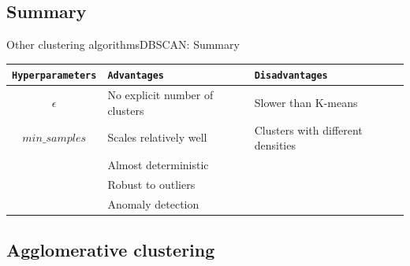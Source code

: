 \documentclass[10pt,compress]{beamer} %
\begin{document}


\subsection{Summary}
\begin{frame}{Other clustering algorithms}{DBSCAN: Summary}
	\begin{center}
	\begin{tabular}{cp{3cm}p{3cm}}\hline
	 	\texttt{Hyperparameters}  & \texttt{Advantages}    & \texttt{Disadvantages} \\\hline
	 	$\epsilon$                & No explicit number of clusters  & Slower than K-means \\
	    $min\_samples$	          & Scales relatively well & Clusters with different densities \\
	                 	          & Almost deterministic   &  \\
	                 	          & Robust to outliers     &  \\
	                 	          & Anomaly detection      &  \\
	 	\hline
	\end{tabular}
	\end{center}
\end{frame}

\subsection{Agglomerative clustering}
\end{document}
